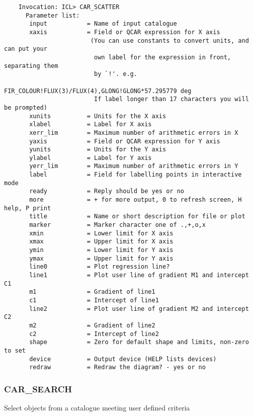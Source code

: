 \begin{verbatim}
    Invocation: ICL> CAR_SCATTER
      Parameter list:
       input           = Name of input catalogue
       xaxis           = Field or QCAR expression for X axis
                        (You can use constants to convert units, and can put your
                         own label for the expression in front, separating them
                         by `!'. e.g.
                         FIR_COLOUR!FLUX(3)/FLUX(4),GLONG!GLONG*57.295779 deg
                         If label longer than 17 characters you will be prompted)
       xunits          = Units for the X axis
       xlabel          = Label for X axis
       xerr_lim        = Maximum number of arithmetic errors in X
       yaxis           = Field or QCAR expression for Y axis
       yunits          = Units for the Y axis
       ylabel          = Label for Y axis
       yerr_lim        = Maximum number of arithmetic errors in Y
       label           = Field for labelling points in interactive mode
       ready           = Reply should be yes or no
       more            = + for more output, 0 to refresh screen, H help, P print
       title           = Name or short description for file or plot
       marker          = Marker character one of .,+,o,x
       xmin            = Lower limit for X axis
       xmax            = Upper limit for X axis
       ymin            = Lower limit for Y axis
       ymax            = Upper limit for Y axis
       line0           = Plot regression line?
       line1           = Plot user line of gradient M1 and intercept C1
       m1              = Gradient of line1
       c1              = Intercept of line1
       line2           = Plot user line of gradient M2 and intercept C2
       m2              = Gradient of line2
       c2              = Intercept of line2
       shape           = Zero for default shape and limits, non-zero to set
       device          = Output device (HELP lists devices)
       redraw          = Redraw the diagram? - yes or no
\end{verbatim}

\subsubsection{CAR\_SEARCH}
 
Select objects from a catalogue meeting user defined criteria

